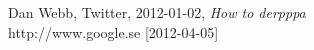 \begin{thebibliography}{99}

 Dan Webb, Twitter, 2012-01-02, {\em How to derpppa}\\http://www.google.se [2012-04-05]

\end{thebibliography}